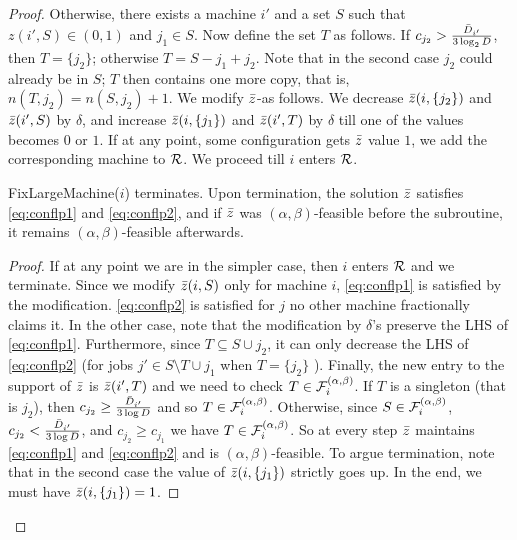 \begin{proof}
Otherwise, there exists a machine $i'$ 
and a set $S$ such that $z(i',S) \in (0,1)$ and $j_1 \in S$. 
Now define the set $T$ as follows. If $c_{j_2} > \frac{\bar{D}_{i'}}{3\log_2 D}$, then $T = \{j_2\}$; otherwise $T = S - j_1 + j_2$. 
Note that in the second case $j_2$ could already be in $S$; $T$ then contains one more copy, that is, $n(T,j_2) = n(S,j_2) + 1$.
We modify $\bar z$-as follows. We decrease $\bar z(i,\{j_2\})$ and $\bar z(i',S)$ by $\delta$, and increase $\bar z(i,\{j_1\})$ and $\bar z(i',T)$ by $\delta$ till one of the values becomes $0$ or $1$. 
If at any point, some configuration gets $\bar z$ value $1$, we add the corresponding machine to ${\cal R}$.
We proceed till $i$ enters ${\cal R}$.

\begin{claim}\label{clm:002}
	{\sf FixLargeMachine}($i$) terminates. Upon termination, the solution $\bar z$ satisfies \eqref{eq:conflp1} and \eqref{eq:conflp2}, and
	if $\bar z$ was $(\alpha,\beta)$-feasible before the subroutine, it remains $(\alpha,\beta)$-feasible afterwards.
\end{claim}
\begin{proof}
	If at any point we are in the simpler case, then $i$ enters ${\cal R}$ and we terminate. Since we modify $\bar z(i,S)$ only for machine $i$, \eqref{eq:conflp1} is satisfied by the modification.
	\eqref{eq:conflp2} is satisfied for $j$ no other machine fractionally claims it. In the other case, note that the modification by $\delta$'s preserve the LHS of \eqref{eq:conflp1}. Furthermore, since $T\subseteq S\cup j_2$, it can only 
	decrease the LHS of \eqref{eq:conflp2} (for jobs $j' \in S\setminus T\cup j_1$ when $T=\{j_2\}$ ). Finally, the new entry to the support of $\bar z$ is $\bar z(i',T)$ and we need to check $T\in {\cal F}^{(\alpha,\beta)}_i$.
	If $T$ is a singleton (that is $j_2$), then $c_{j_2} \geq \frac{\bar{D}_{i'}}{3\log D}$ and so $T\in {\cal F}^{(\alpha,\beta)}_i$.
  Otherwise, since $S\in {\cal F}^{(\alpha,\beta)}_i$, $c_{j_2} <  \frac{\bar{D}_{i'}}{3\log D}$, and $c_{j_2} \geq c_{j_1}$ we have $T\in {\cal F}^{(\alpha,\beta)}_i$. 
  So at every step $\bar z$ maintains \eqref{eq:conflp1} and \eqref{eq:conflp2} and is $(\alpha,\beta)$-feasible. To argue termination, note that in the second case the value of $\bar z(i,\{j_1\})$ strictly goes up.
  In the end, we must have $\bar z(i,\{j_1\}) = 1$.
\end{proof}


\end{proof}
